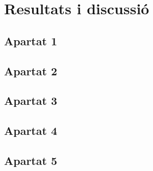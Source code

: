 \section{Resultats i discussió}
\subsection{Apartat 1}

\subsection{Apartat 2}

\subsection{Apartat 3}

\subsection{Apartat 4}

\subsection{Apartat 5}
